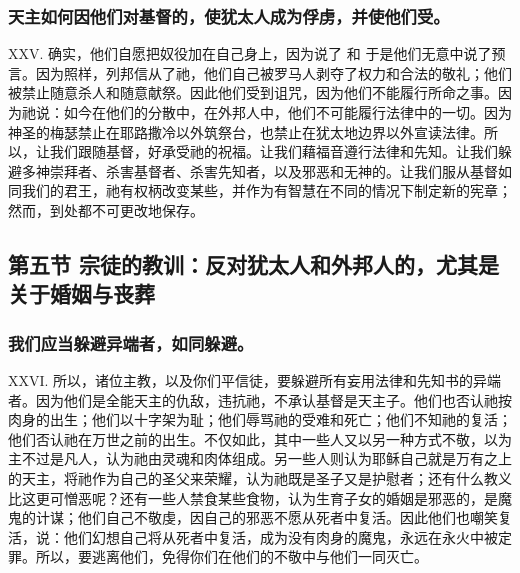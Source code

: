 
\subsubsection{天主如何因他们对基督的，使犹太人成为俘虏，并使他们受。}

XXV. 确实，他们自愿把奴役加在自己身上，因为说了 和 于是他们无意中说了预言。因为照样，列邦信从了祂，他们自己被罗马人剥夺了权力和合法的敬礼；他们被禁止随意杀人和随意献祭。因此他们受到诅咒，因为他们不能履行所命之事。因为祂说：如今在他们的分散中，在外邦人中，他们不可能履行法律中的一切。因为神圣的梅瑟禁止在耶路撒冷以外筑祭台，也禁止在犹太地边界以外宣读法律。所以，让我们跟随基督，好承受祂的祝福。让我们藉福音遵行法律和先知。让我们躲避多神崇拜者、杀害基督者、杀害先知者，以及邪恶和无神的。让我们服从基督如同我们的君王，祂有权柄改变某些，并作为有智慧在不同的情况下制定新的宪章；然而，到处都不可更改地保存。\par


\subsection{第五节 宗徒的教训：反对犹太人和外邦人的，尤其是关于婚姻与丧葬}


\subsubsection{我们应当躲避异端者，如同躲避。}

XXVI. 所以，诸位主教，以及你们平信徒，要躲避所有妄用法律和先知书的异端者。因为他们是全能天主的仇敌，违抗祂，不承认基督是天主子。他们也否认祂按肉身的出生；他们以十字架为耻；他们辱骂祂的受难和死亡；他们不知祂的复活；他们否认祂在万世之前的出生。不仅如此，其中一些人又以另一种方式不敬，以为主不过是凡人，认为祂由灵魂和肉体组成。另一些人则认为耶稣自己就是万有之上的天主，将祂作为自己的圣父来荣耀，认为祂既是圣子又是护慰者；还有什么教义比这更可憎恶呢？还有一些人禁食某些食物，认为生育子女的婚姻是邪恶的，是魔鬼的计谋；他们自己不敬虔，因自己的邪恶不愿从死者中复活。因此他们也嘲笑复活，说：他们幻想自己将从死者中复活，成为没有肉身的魔鬼，永远在永火中被定罪。所以，要逃离他们，免得你们在他们的不敬中与他们一同灭亡。\par

